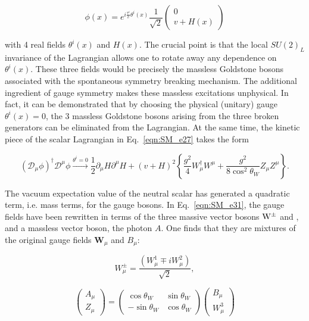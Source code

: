 \begin{equation}\label{eqn:SM_e30}
\phi(x) = e^{i\frac{\tau^i}{v}\theta^i(x)}\frac{1}{\sqrt{2}}
\begin{pmatrix}
  0 \\ v + H(x)
\end{pmatrix}
\end{equation}

\noindent with 4 real fields $\theta^i(x)$ and $H(x)$.
The crucial point is that the local $SU(2)_L$ invariance of the Lagrangian allows one to rotate away any dependence on $\theta^i(x)$.
These three fields would be precisely the massless Goldstone bosons associated with the spontaneous symmetry breaking mechanism.
The additional ingredient of gauge symmetry makes these massless excitations unphysical.
In fact, it can be demonstrated that by choosing the physical (unitary) gauge $\theta^i(x) = 0$, the 3 massless Goldstone bosons
arising from the three broken generators can be eliminated from the Lagrangian.
At the same time, the kinetic piece of the scalar Lagrangian in Eq.~\ref{eqn:SM_e27} takes the form

\begin{equation}\label{eqn:SM_e31}
(\mathcal{D}_\mu\phi)^\dag\mathcal{D}^\mu\phi \xrightarrow{\theta^i = 0} \frac{1}{2}\partial_\mu H\partial^\mu H + (v+H)^2 \left\{ \frac{g^2}{4}W^\dag_\mu W^\mu + \frac{g^2}{8\cos^2\theta_W}Z_\mu Z^\mu \right\}.
\end{equation}

The vacuum expectation value of the neutral scalar has generated a quadratic term, i.e. mass terms, for the gauge bosons.
In Eq.~\ref{eqn:SM_e31}, the gauge fields have been rewritten in terms of the three massive vector bosons $\mathrm{W}^\pm$ and \PZ, and a massless vector boson, the photon $A$.
One finds that they are mixtures of the original gauge fields $\mathbf{W}_\mu$ and $B_\mu$:

\begin{equation}\label{eqn:SM_e32}
W^\pm_\mu = \frac{(W^1_\mu \mp iW^2_\mu)}{\sqrt{2}},
\end{equation}

\begin{equation}\label{eqn:SM_e33}
\begin{pmatrix}
  A_\mu \\ Z_\mu
\end{pmatrix}
=
\begin{pmatrix}
  \cos\theta_W & \sin\theta_W \\ -\sin\theta_W & \cos\theta_W
\end{pmatrix}
\begin{pmatrix}
  B_\mu \\ W^3_\mu
\end{pmatrix}
\end{equation}

